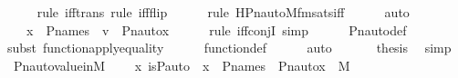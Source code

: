 \begin{isabellebody}
\ \ \ \ \isamarkupfalse%
{\isacharparenleft}{\kern0pt}rule\ iff{\isacharunderscore}{\kern0pt}trans{\isacharcomma}{\kern0pt}\ rule\ iff{\isacharunderscore}{\kern0pt}flip{\isacharparenright}{\kern0pt}\isanewline
\ \ \ \ \ \isamarkupfalse%
{\isacharparenleft}{\kern0pt}rule\ HPn{\isacharunderscore}{\kern0pt}auto{\isacharunderscore}{\kern0pt}M{\isacharunderscore}{\kern0pt}fm{\isacharprime}{\kern0pt}{\isacharunderscore}{\kern0pt}sats{\isacharunderscore}{\kern0pt}iff{\isacharparenright}{\kern0pt}\isanewline
\ \ \ \ \isamarkupfalse%
\ auto\isanewline
\ \ \isamarkupfalse%
\ \isamarkupfalse%
\ {\isachardoublequoteopen}{\isachardot}{\kern0pt}{\isachardot}{\kern0pt}{\isachardot}{\kern0pt}\ {\isasymlongleftrightarrow}\ x\ {\isasymin}\ P{\isacharunderscore}{\kern0pt}names\ {\isasymand}\ v\ {\isacharequal}{\kern0pt}\ Pn{\isacharunderscore}{\kern0pt}auto{\isacharparenleft}{\kern0pt}{\isasympi}{\isacharparenright}{\kern0pt}{\isacharbackquote}{\kern0pt}x{\isachardoublequoteclose}\ \isanewline
\ \ \ \ \isamarkupfalse%
{\isacharparenleft}{\kern0pt}rule\ iff{\isacharunderscore}{\kern0pt}conjI{}{\isacharcomma}{\kern0pt}\ simp{\isacharparenright}{\kern0pt}\isanewline
\ \ \ \ \isamarkupfalse%
\ Pn{\isacharunderscore}{\kern0pt}auto{\isacharunderscore}{\kern0pt}def\ \isanewline
\ \ \ \ \isamarkupfalse%
{\isacharparenleft}{\kern0pt}subst\ function{\isacharunderscore}{\kern0pt}apply{\isacharunderscore}{\kern0pt}equality{\isacharparenright}{\kern0pt}\isanewline
\ \ \ \ \isamarkupfalse%
\ function{\isacharunderscore}{\kern0pt}def\isanewline
\ \ \ \ \isamarkupfalse%
\ auto\ \isanewline
\ \ \isamarkupfalse%
\ \isamarkupfalse%
\ {\isacharquery}{\kern0pt}thesis\ \isamarkupfalse%
\ simp\isanewline
{}\isamarkupfalse%
%
\endisatagproof
{\isafoldproof}%
%
\isadelimproof
\isanewline
%
\endisadelimproof
\isanewline
{}\isamarkupfalse%
\ Pn{\isacharunderscore}{\kern0pt}auto{\isacharunderscore}{\kern0pt}value{\isacharunderscore}{\kern0pt}in{\isacharunderscore}{\kern0pt}M\ {\isacharcolon}{\kern0pt}\ \isanewline
\ \ {\isachardoublequoteopen}{\isasymAnd}x{\isachardot}{\kern0pt}\ is{\isacharunderscore}{\kern0pt}P{\isacharunderscore}{\kern0pt}auto{\isacharparenleft}{\kern0pt}{\isasympi}{\isacharparenright}{\kern0pt}\ {\isasymLongrightarrow}\ x\ {\isasymin}\ P{\isacharunderscore}{\kern0pt}names\ {\isasymLongrightarrow}\ Pn{\isacharunderscore}{\kern0pt}auto{\isacharparenleft}{\kern0pt}{\isasympi}{\isacharparenright}{\kern0pt}{\isacharbackquote}{\kern0pt}x\ {\isasymin}\ M{\isachardoublequoteclose}\ \isanewline

\end{isabellebody}
